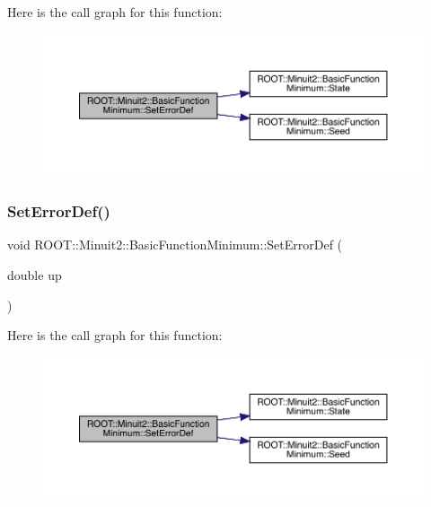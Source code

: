 Here is the call graph for this function\+:
\nopagebreak
\begin{figure}[H]
\begin{center}
\leavevmode
\includegraphics[width=350pt]{de/d25/classROOT_1_1Minuit2_1_1BasicFunctionMinimum_ae89163fbfaccda743a6ca8d3add896dc_cgraph}
\end{center}
\end{figure}
\mbox{\label{classROOT_1_1Minuit2_1_1BasicFunctionMinimum_ae89163fbfaccda743a6ca8d3add896dc}} 
\subsubsection{\texorpdfstring{SetErrorDef()}{SetErrorDef()}\hspace{0.1cm}{\footnotesize\ttfamily [2/3]}}
{\footnotesize\ttfamily void R\+O\+O\+T\+::\+Minuit2\+::\+Basic\+Function\+Minimum\+::\+Set\+Error\+Def (\begin{DoxyParamCaption}\item[{double}]{up }\end{DoxyParamCaption})\hspace{0.3cm}{\ttfamily [inline]}}

Here is the call graph for this function\+:
\nopagebreak
\begin{figure}[H]
\begin{center}
\leavevmode
\includegraphics[width=350pt]{de/d25/classROOT_1_1Minuit2_1_1BasicFunctionMinimum_ae89163fbfaccda743a6ca8d3add896dc_cgraph}
\end{center}
\end{figure}
\mbox{\label{classROOT_1_1Minuit2_1_1BasicFunctionMinimum_ae89163fbfaccda743a6ca8d3add896dc}} 
